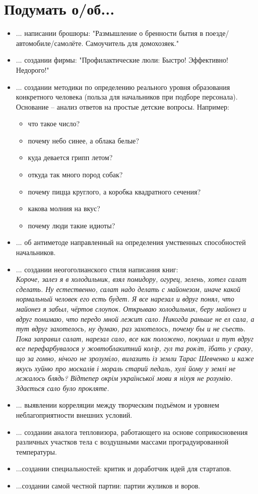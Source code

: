 \section{Подумать о/об...}
\begin{itemize}
\item ... написании брошюры: "Размышление о бренности бытия в поезде/автомобиле/самолёте. Самоучитель для домохозяек."
\item ... создании фирмы: "Профилактические люли: Быстро! Эффективно! Недорого!"
\item ...  создании методики по определению реального уровня образования конкретного человека (польза для начальников при подборе персонала). Основание -- анализ ответов на простые детские вопросы.
Например:
    \begin{itemize}
        \item что такое число?
        \item почему небо синее, а облака белые?
        \item куда девается грипп летом?
        \item откуда так много пород собак?
        \item почему пицца круглого, а коробка квадратного сечения?
        \item какова молния на вкус?
        \item почему люди такие идиоты?
    \end{itemize}
\item ... об антиметоде направленный на определения умственных способностей начальников.    
\item ... создании неогоголианского стиля написания книг:\\
    \emph{Короче, залез я в холодильник, взял помидору, огурец, зелень, хотел салат сделать. Ну естественно, 
        салат надо делать с майонезом, иначе какой нормальный человек его есть будет. Я все нарезал и вдруг 
        понял, что майонез я забыл, чёртов слоупок. Открываю холодильник, беру майонез и вдруг понимаю, что 
        передо мной лежит сало. Никогда раньше не ел сала, а тут вдруг захотелось, ну думаю, раз захотелось, 
        почему бы и не съесть. Пока заправил салат, нарезал сало, все как положено, покушал и тут вдруг все 
        перефарбувалося у жовтоблакитний колiр, гул та рокiт, їбать у сраку, що за гомно, нічого не 
        зрозуміло, вилазить із земли Тарас Шевченко и каже якусь хуйню про москалів і мораль старий педаль, 
        хулі йому у землі не лєжалось блядь? Відтепер окрім української мови я ніхуя не розумію. Здається 
        сало було прокляте.}
\item ... выявлении корреляции между творческим подъёмом и уровнем неблагоприятности внешних условий.
\item ... создании аналога тепловизора, работающего на основе соприкосновения различных участков тела с воздушными массами проградуированной температуры.
\item ...создании специальностей: критик и доработчик идей для стартапов.
\item ...создании самой честной партии: партии жуликов и воров.
\end{itemize}
